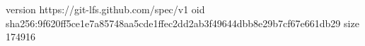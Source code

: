 version https://git-lfs.github.com/spec/v1
oid sha256:9f620ff5ce1e7a85748aa5cde1ffec2dd2ab3f49644dbb8e29b7cf67e661db29
size 174916
